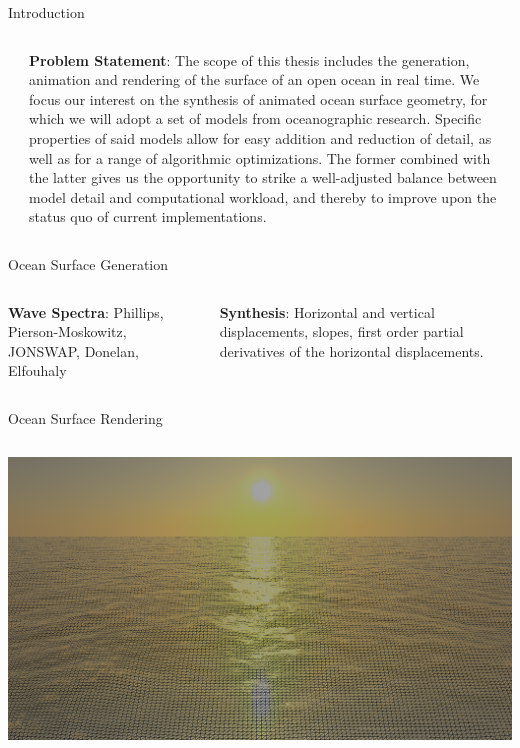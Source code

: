 \documentclass[final,hyperref={pdfpagelabels=true}]{beamer}
\begin{document}
\begin{frame}
\begin{center}
\begin{minipage}{\textwidth}
\begin{block}{Introduction}
\begin{columns}[t]
\begin{column}{0.45\linewidth}
				\end{column}
				\begin{column}{0.45\linewidth}
					\textbf{Problem Statement}:
					The scope of this thesis includes the generation, animation and rendering of the
					surface of an open ocean in real time. We focus our interest on the synthesis of
					animated ocean surface geometry, for which we will adopt a set of models from
					oceanographic research. Specific properties of said models allow for
					easy addition and reduction of detail, as well as for a range of algorithmic
					optimizations. The former combined with the latter gives us the opportunity to
					strike a well-adjusted balance between model detail and computational workload,
					and thereby to improve upon the status quo of current implementations.
				\end{column}	  
			\end{columns}
		\end{block}
	\end{minipage}
	\begin{minipage}{\textwidth}
		\begin{block}{Ocean Surface Generation}	
			\begin{columns}[t]
				\begin{column}{0.45\linewidth}
					\textbf{Wave Spectra}:
					Phillips, Pierson-Moskowitz, JONSWAP, Donelan, Elfouhaly
				\end{column}
				\begin{column}{0.45\linewidth}
					\textbf{Synthesis}:
					Horizontal and vertical displacements, slopes, first order partial derivatives of the horizontal displacements.
				\end{column}	  
			\end{columns}
		\end{block}
	\end{minipage}
	\begin{minipage}{\textwidth}
		\begin{block}{Ocean Surface Rendering}
			\begin{columns}[t]
				\begin{column}{0.75\linewidth}
					\begin{center}
					\noindent
					\includegraphics[width=0.225\columnwidth]{figures/28-05-2018_10-56-10_grid}

\end{center}
\end{column}
\end{columns}
\end{block}
\end{minipage}
\end{center}
\end{frame}
\end{document}
